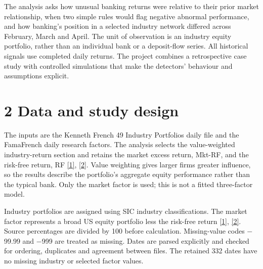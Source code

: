 \documentclass[11pt,a4paper]{article}
\begin{document}
The analysis asks how unusual banking returns were relative to their prior market relationship, when two simple rules would flag negative abnormal performance, and how banking's position in a selected industry network differed across February, March and April. The unit of observation is an industry equity portfolio, rather than an individual bank or a deposit-flow series. All historical signals use completed daily returns. The project combines a retrospective case study with controlled simulations that make the detectors' behaviour and assumptions explicit.

\clearpage
\section*{2 Data and study design}
The inputs are the Kenneth French 49 Industry Portfolios daily file and the Fama\textendash{}French daily research factors. The analysis selects the value-weighted industry-return section and retains the market excess return, Mkt-RF, and the risk-free return, RF \hyperlink{ref1}{[1]}, \hyperlink{ref2}{[2]}. Value weighting gives larger firms greater influence, so the results describe the portfolio's aggregate equity performance rather than the typical bank. Only the market factor is used; this is not a fitted three-factor model.

Industry portfolios are assigned using SIC industry classifications. The market factor represents a broad US equity portfolio less the risk-free return \hyperlink{ref1}{[1]}, \hyperlink{ref2}{[2]}. Source percentages are divided by 100 before calculation. Missing-value codes $-$99.99 and $-$999 are treated as missing. Dates are parsed explicitly and checked for ordering, duplicates and agreement between files. The retained 332 dates have no missing industry or selected factor values.
\end{document}
